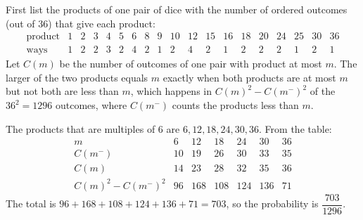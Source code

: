 First list the products of one pair of dice with the number of ordered outcomes (out of $36$) that give each product:
\[\begin{array}{c|cccccccccccccccccc}
\text{product}&1&2&3&4&5&6&8&9&10&12&15&16&18&20&24&25&30&36\\\hline
\text{ways}&1&2&2&3&2&4&2&1&2&4&2&1&2&2&2&1&2&1
\end{array}\]
Let $C(m)$ be the number of outcomes of one pair with product at most $m$. The larger of the two products equals $m$ exactly when both products are at most $m$ but not both are less than $m$, which happens in $C(m)^2-C(m^-)^2$ of the $36^2=1296$ outcomes, where $C(m^-)$ counts the products less than $m$.

The products that are multiples of $6$ are $6,12,18,24,30,36$. From the table:
\[\begin{array}{c|cccccc}
m&6&12&18&24&30&36\\\hline
C(m^-)&10&19&26&30&33&35\\
C(m)&14&23&28&32&35&36\\
C(m)^2-C(m^-)^2&96&168&108&124&136&71
\end{array}\]
The total is $96+168+108+124+136+71=703$, so the probability is $\boxed{\dfrac{703}{1296}}$.
